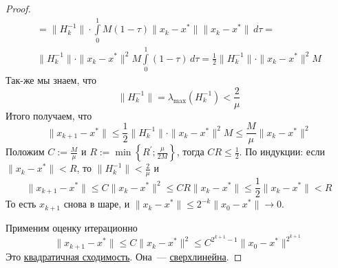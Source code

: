 \begin{proof}
\begin{multline*}
  =
  \| H_k^{-1}\| \cdot \int\limits_0^1 M (1-\tau) \| x_k - x^{*} \| \| x_k - x^{*} \| \,d\tau
  =  \\
  \| H_k^{-1}\| \cdot \| x_k - x^{*} \|^2  M \int\limits_0^1 (1-\tau)  \,d\tau =  \frac{1}{2} \| H_k^{-1}\| \cdot \| x_k - x^{*} \|^2 M
  \end{multline*}
  Так-же мы знаем, что
  \[
  \|H_k^{-1}\| = \lambda_{\max}(H_k^{-1}) < \frac{2}{\mu}
  \]
  Итого получаем, что
  \[
  \|x_{k+1} - x^{*}\| \le   \frac{1}{2} \| H_k^{-1}\| \cdot \| x_k - x^{*} \|^2 M \le \frac{M}{\mu}\|x_k - x^{*}\|^2
  \]
  Положим $C := \frac{M}{\mu}$ и $R := \min \left\{ R^{\prime}; \frac{\mu}{2M} \right\}$, тогда $CR \le \frac{1}{2}$.
  По индукции: если $\|x_k - x^{*}\| < R$, то $\|H_k^{-1}\| < \frac{2}{\mu}$ и
  \[
  \|x_{k+1} - x^{*}\| \le C \|x_k - x^{*}\|^2 \le CR \|x_k - x^{*}\| \le \frac{1}{2} \|x_k - x^{*}\| < R
  \]
  То есть $x_{k+1}$ снова в шаре, и $\|x_k - x^{*}\| \le 2^{-k} \|x_0 - x^{*}\| \rightarrow 0$.

  Применим оценку итерационно
  \[
  \|x_{k+1}-x^{*}\| \le C \|x_k - x^{*}\|^2 \le C^{2^{k+1}-1} \|x_0 - x^{*}\|^{2^{k+1}}
  \]
  Это \hyperref[note:FDA5DA6F-DE0F-437E-A4F4-89757BA7F538]{квадратичная сходимость}. Она~--- \hyperref[note:4CD0DF77-0553-4E99-901D-4D4C50C9900C]{сверхлинейна}.
\end{proof}
